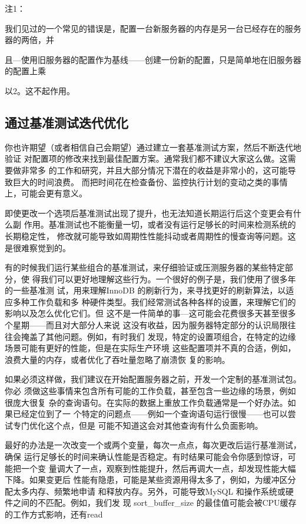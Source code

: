 注1：

我们见过的一个常见的错误是，配置一台新服务器的内存是另一台已经存在的服务器的两倍，并

且—使用旧服务器的配置作为基线——创建一份新的配置，只是简单地在旧服务器的配置上乘

以2。这不起作用。

\subsection{通过基准测试迭代优化}
你也许期望（或者相信自己会期望）通过建立一套基准测试方案，然后不断迭代地验证
对配置项的修改来找到最佳配置方案。通常我们都不建议大家这么做。这需要做非常多
的工作和研究，并且大部分情况下潜在的收益是非常小的，这可能导致巨大的时间浪费。
而把时间花在检查备份、监控执行计划的变动之类的事情上，可能会更有意义。

即使更改一个选项后基准测试出现了提升，也无法知道长期运行后这个变更会有什么副
作用。基准测试也不能衡量一切，或者没有运行足够长的时间来检测系统的长期稳定性，
修改就可能导致如周期性性能抖动或者周期性的慢查询等问题。这是很难察觉到的。

有的时候我们运行某些组合的基准测试，来仔细验证或压测服务器的某些特定部分，使
得我们可以更好地理解这些行为。一个很好的例子是，我们使用了很多年的一些基准测
试，用来理解InnoDB 的刷新行为，来寻找更好的刷新算法，以适应多种工作负载和多
种硬件类型。我们经常测试各种各样的设置，来理解它们的影响以及怎么优化它们。但
这不是一件简单的事—这可能会花费很多天甚至很多个星期——而且对大部分人来说
这没有收益，因为服务器特定部分的认识局限往往会掩盖了其他问题。例如，有时我们
发现，特定的设置项组合，在特定的边缘场景可能有更好的性能，但是在实际生产环境
这些配置项并不真的合适，例如，浪费大量的内存，或者优化了吞吐量忽略了崩溃恢
复的影响。

如果必须这样做，我们建议在开始配置服务器之前，开发一个定制的基准测试包。你必
须做这些事情来包含所有可能的工作负载，甚至包含一些边缘的场景，例如很庞大很复
杂的查询语句。在实际的数据上重放工作负载通常是一个好办法。如果已经定位到了一
个特定的问题点——例如一个查询语句运行很慢——也可以尝试专门优化这个点，但是
可能不知道这会对其他查询有什么负面影响。

最好的办法是一次改变一个或两个变量，每次一点点，每次更改后运行基准测试，确保
运行足够长的时间来确认性能是否稳定。有时结果可能会令你感到惊讶，可能把一个变
量调大了一点，观察到性能提升，然后再调大一点，却发现性能大幅下降。如果变更后
性能有隐患，可能是某些资源用得太多了，例如，为缓冲区分配太多内存、频繁地申请
和释放内存。另外，可能导致MySQL 和操作系统或硬件之间的不匹配。例如，我们发
现 sort\_buffer\_size 的最佳值可能会被CPU缓存的工作方式影响，还有read

